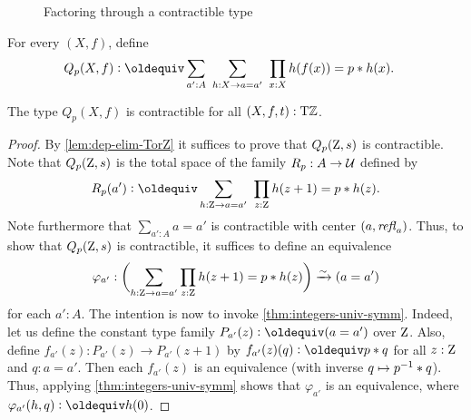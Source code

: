 \documentclass[a4,12pt]{amsart}
\begin{document}
\begin{figure}
\caption{\label{fig:TorZ-recursion}Factoring through a contractible type}
\end{figure}

\begin{definition}\label{def:guided-null-hmtps}
For every $(X,f)$, define
\begin{align*}\label{eq:TBD}
Q_p(X,f)&\defeq \sum_{a':A}~\sum_{h:X\to a=a'}~\prod_{x:X} h(f(x))=p\ct h(x).
\end{align*}
\end{definition}

\begin{lemma}\label{lem:guided-null-hmtps}
The type $Q_p(X,f)$ is contractible for all $(X,f,t):{\mathrm{T}\mathbb{Z}}$.
\end{lemma}
\begin{proof}
  By \cref{lem:dep-elim-TorZ} it suffices to prove that $Q_p(\mathrm{Z},s)$ is contractible.
  Note that $Q_p(\mathrm{Z},s)$ is the total space of the family $R_p : A \to \mathcal{U}$ defined by
  \[
    R_p(a') \defeq \sum_{h:\zet \to a=a'}~\prod_{z:\zet} h(z+1)=p\ct h(z).
  \]
  Note furthermore that $\sum_{a':A} a=a'$ is contractible with center $(a,\mathop{{\it refl}_{a}})$.
  Thus, to show that $Q_p(\mathrm{Z},s)$ is contractible,
  it suffices to define an equivalence
  \[
    \varphi_{a'} : \biggl(\sum_{h:\mathrm{Z} \to a=a'}\prod_{z:\mathrm{Z}} h(z+1)=p* h(z)\biggr) \xrightarrow{\sim}{} (a=a')
  \]
  for each $a':A$.
  The intention is now to invoke \cref{thm:integers-univ-symm}.
  Indeed, let us define the constant type family $P_{a'}(z)\defeq(a=a')$
  over $\mathrm{Z}$. Also, define $f_{a'}(z) : P_{a'}(z) \to P_{a'}(z+1)$
  by $f_{a'}(z)(q) \defeq p \ct q$ for all $z:\mathrm{Z}$ and $q: a=a'$.
  Then each $f_{a'}(z)$ is an equivalence (with inverse $q \mapsto p^{-1}* q$).
  Thus, applying \cref{thm:integers-univ-symm}
  shows that $\varphi_{a'}$ is an equivalence,
  where $\varphi_{a'}(h,q) \defeq h(0)$.
\end{proof}
\end{document}
